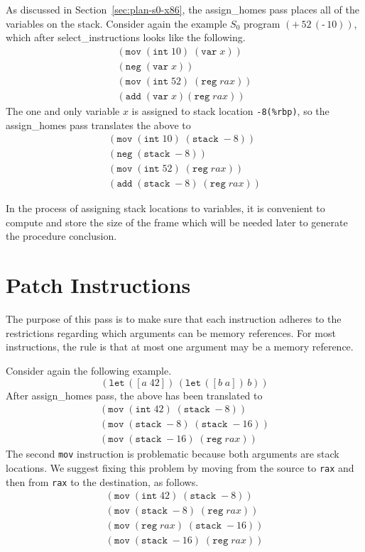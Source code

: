\documentclass[12pt]{book}
\newcommand{\itm}[1]{\ensuremath{\mathit{#1}}}
\newcommand{\key}[1]{\texttt{#1}}
\newcommand{\UNIOP}[2]{(\key{#1}\,#2)}
\newcommand{\BINOP}[3]{(\key{#1}\,#2\,#3)}
\newcommand{\LET}[3]{(\key{let}\,([#1\;#2])\,#3)}
\newcommand{\INT}[1]{(\key{int}\;#1)}
\newcommand{\REG}[1]{(\key{reg}\;#1)}
\newcommand{\VAR}[1]{(\key{var}\;#1)}
\newcommand{\STACKLOC}[1]{(\key{stack}\;#1)}
\begin{document}
As discussed in Section~\ref{sec:plan-s0-x86}, the
\textsf{assign\_homes} pass places all of the variables on the stack.
Consider again the example $S_0$ program $\BINOP{+}{52}{ \UNIOP{-}{10} }$,
which after \textsf{select\_instructions} looks like the following.
\[
\begin{array}{l}
(\key{mov}\;\INT{10}\; \VAR{x})\\
(\key{neg}\; \VAR{x})\\
(\key{mov}\; \INT{52}\; \REG{\itm{rax}})\\
(\key{add}\; \VAR{x} \REG{\itm{rax}})
\end{array}
\]
The one and only variable $x$ is assigned to stack location
\key{-8(\%rbp)}, so the \textsf{assign\_homes} pass translates the
above to
\[
\begin{array}{l}
(\key{mov}\;\INT{10}\; \STACKLOC{{-}8})\\
(\key{neg}\; \STACKLOC{{-}8})\\
(\key{mov}\; \INT{52}\; \REG{\itm{rax}})\\
(\key{add}\; \STACKLOC{{-}8}\; \REG{\itm{rax}})
\end{array}
\]

In the process of assigning stack locations to variables, it is
convenient to compute and store the size of the frame which will be
needed later to generate the procedure conclusion.

\section{Patch Instructions}

The purpose of this pass is to make sure that each instruction adheres
to the restrictions regarding which arguments can be memory
references. For most instructions, the rule is that at most one
argument may be a memory reference.

Consider again the following example.
\[
\LET{a}{42}{ \LET{b}{a}{ b }}
\]
After \textsf{assign\_homes} pass, the above has been translated to
\[
\begin{array}{l}
(\key{mov} \;\INT{42}\; \STACKLOC{{-}8})\\
(\key{mov}\;\STACKLOC{{-}8}\; \STACKLOC{{-}16})\\
(\key{mov}\;\STACKLOC{{-}16}\; \REG{\itm{rax}})
\end{array}
\]
The second \key{mov} instruction is problematic because both arguments
are stack locations. We suggest fixing this problem by moving from the
source to \key{rax} and then from \key{rax} to the destination, as
follows.
\[
\begin{array}{l}
(\key{mov} \;\INT{42}\; \STACKLOC{{-}8})\\
(\key{mov}\;\STACKLOC{{-}8}\; \REG{\itm{rax}})\\
(\key{mov}\;\REG{\itm{rax}}\; \STACKLOC{{-}16})\\
(\key{mov}\;\STACKLOC{{-}16}\; \REG{\itm{rax}})
\end{array}
\]
\end{document}

